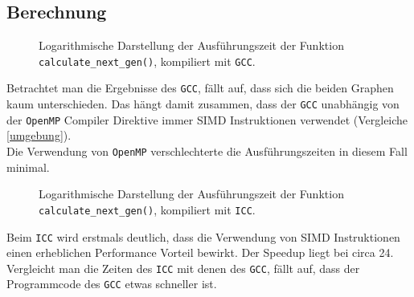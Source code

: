 \documentclass[german,plainarticle,hyperref,utf8]{zihpub}
\begin{document}
	\subsection{Berechnung}
	\begin{figure}[h]
		\centering
		\caption{Logarithmische Darstellung der Ausführungszeit der Funktion \texttt{calculate\_next\_gen()}, kompiliert mit \texttt{GCC}.}
	\end{figure}
	Betrachtet man die Ergebnisse des \texttt{GCC}, fällt auf, dass sich die beiden Graphen kaum unterschieden. Das hängt damit zusammen, dass der \texttt{GCC} unabhängig von der \texttt{OpenMP} Compiler Direktive immer SIMD Instruktionen verwendet (Vergleiche \ref{umgebung}).\\
	Die Verwendung von \texttt{OpenMP} verschlechterte die Ausführungszeiten in diesem Fall minimal.
	\clearpage
	\begin{figure}[h]
		\centering
		\caption{Logarithmische Darstellung der Ausführungszeit der Funktion \texttt{calculate\_next\_gen()}, kompiliert mit \texttt{ICC}.}
	\end{figure}
	Beim \texttt{ICC} wird erstmals deutlich, dass die Verwendung von SIMD Instruktionen einen erheblichen Performance Vorteil bewirkt. Der Speedup liegt bei circa 24.\\
	Vergleicht man die Zeiten des \texttt{ICC} mit denen des \texttt{GCC}, fällt auf, dass der Programmcode des \texttt{GCC} etwas schneller ist.
	\newpage
	\appendix
\end{document}
